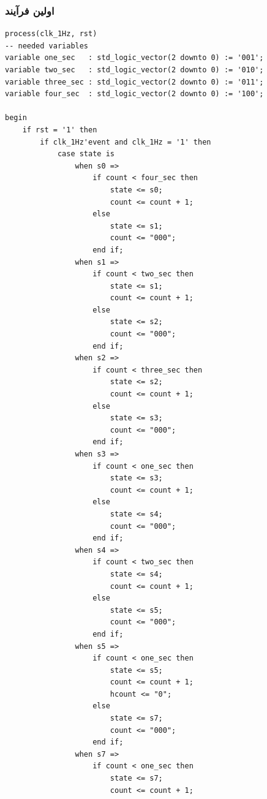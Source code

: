 \documentclass[dvipsnames, svgnames, x11names, a4paper, 11pt]{article}
\begin{document}
\subsubsection{اولین فرآیند}
\begin{latin}
\begin{lstlisting}[firstnumber=29]
process(clk_1Hz, rst)
-- needed variables
variable one_sec   : std_logic_vector(2 downto 0) := '001';
variable two_sec   : std_logic_vector(2 downto 0) := '010';
variable three_sec : std_logic_vector(2 downto 0) := '011';
variable four_sec  : std_logic_vector(2 downto 0) := '100';

begin
	if rst = '1' then
        if clk_1Hz'event and clk_1Hz = '1' then
            case state is
                when s0 =>
                    if count < four_sec then
                        state <= s0;
                        count <= count + 1;
                    else
                        state <= s1;
                        count <= "000";
                    end if;
                when s1 =>
                    if count < two_sec then
                        state <= s1;
                        count <= count + 1;
                    else
                        state <= s2;
                        count <= "000";
                    end if;
                when s2 =>
                    if count < three_sec then
                        state <= s2;
                        count <= count + 1;
                    else
                        state <= s3;
                        count <= "000";
                    end if;
                when s3 =>
                    if count < one_sec then
                        state <= s3;
                        count <= count + 1;
                    else
                        state <= s4;
                        count <= "000";
                    end if;
                when s4 =>
                    if count < two_sec then
                        state <= s4;
                        count <= count + 1;
                    else
                        state <= s5;
                        count <= "000";
                    end if;
                when s5 =>
                    if count < one_sec then
                        state <= s5;
                        count <= count + 1;
                        hcount <= "0";
                    else
                        state <= s7;
                        count <= "000";
                    end if;
                when s7 =>
                    if count < one_sec then
                        state <= s7;
                        count <= count + 1;

\end{lstlisting}
\end{latin}
\end{document}
